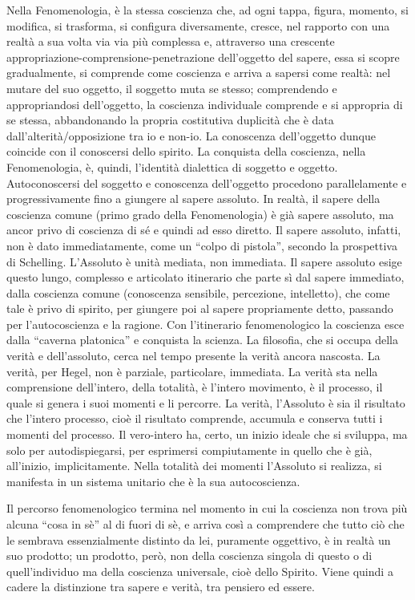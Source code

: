 \documentclass[a4paper,12pt,oneside,openany]{book}%
\begin{document}
Nella Fenomenologia, è la stessa coscienza che, ad ogni tappa, figura, momento, si modifica, si trasforma, si configura diversamente, cresce, nel rapporto con una realtà a sua volta via via più complessa e, attraverso una crescente appropriazione-comprensione-penetrazione dell’oggetto del sapere, essa si scopre gradualmente, si comprende come coscienza e arriva a sapersi come realtà: nel mutare del suo oggetto, il soggetto muta se stesso; comprendendo e appropriandosi dell’oggetto, la coscienza individuale comprende e si appropria di se stessa, abbandonando la propria costitutiva duplicità che è data dall’alterità/opposizione tra io e non-io. La conoscenza dell’oggetto dunque coincide con il conoscersi dello spirito. La conquista della coscienza, nella Fenomenologia, è, quindi, l’identità dialettica di soggetto e oggetto. Autoconoscersi del soggetto e conoscenza dell’oggetto procedono parallelamente e progressivamente fino a giungere al sapere assoluto. In realtà, il sapere della coscienza comune (primo grado della Fenomenologia) è già sapere assoluto, ma ancor privo di coscienza di sé e quindi ad esso diretto. Il sapere assoluto, infatti, non è dato immediatamente, come un “colpo di pistola”, secondo la prospettiva di Schelling. L’Assoluto è unità mediata, non immediata. Il sapere assoluto esige questo lungo, complesso e articolato itinerario che parte sì dal sapere immediato, dalla coscienza comune (conoscenza sensibile, percezione, intelletto), che come tale è privo di spirito, per giungere poi al sapere propriamente detto, passando per l’autocoscienza e la ragione. Con l’itinerario fenomenologico la coscienza esce dalla “caverna platonica” e conquista la scienza. La filosofia, che si occupa della verità e dell’assoluto, cerca nel tempo presente la verità ancora nascosta. La verità, per Hegel, non è parziale, particolare, immediata. La verità sta nella comprensione dell’intero, della totalità, è l’intero movimento, è il processo, il quale si genera i suoi momenti e li percorre. La verità, l’Assoluto è sia il risultato che l’intero processo, cioè il risultato comprende, accumula e conserva tutti i momenti del processo. Il vero-intero ha, certo, un inizio ideale che si sviluppa, ma solo per autodispiegarsi, per esprimersi compiutamente in quello che è già, all’inizio, implicitamente. Nella totalità dei momenti l’Assoluto si realizza, si manifesta in un sistema unitario che è la sua autocoscienza.

Il percorso fenomenologico termina nel momento in cui la coscienza non trova più alcuna “cosa in sè” al di fuori di sè, e arriva così a comprendere che tutto ciò che le sembrava essenzialmente distinto da lei, puramente oggettivo, è in realtà un suo prodotto; un prodotto, però, non della coscienza singola di questo o di quell’individuo ma della coscienza universale, cioè dello Spirito. Viene quindi a cadere la distinzione tra sapere e verità, tra pensiero ed essere.
\end{document}
